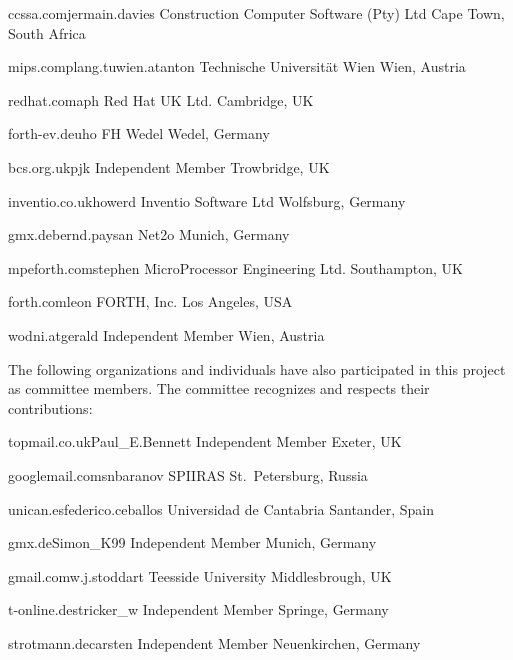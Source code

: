 	{ccssa.com}{jermain.davies}
	{Construction Computer Software (Pty) Ltd}
	{Cape Town, South Africa}

	{mips.complang.tuwien.at}{anton}
	{Technische Universit\"at Wien}
	{Wien, Austria}

	{redhat.com}{aph}
	{Red Hat UK Ltd.}
	{Cambridge, UK}

	{forth-ev.de}{uho}
	{FH Wedel}
	{Wedel, Germany}

	{bcs.org.uk}{pjk}
	{Independent Member}
	{Trowbridge, UK}

	{inventio.co.uk}{howerd}
	{Inventio Software Ltd}
	{Wolfsburg, Germany}

	{gmx.de}{bernd.paysan}
	{Net2o}
	{Munich, Germany}

	{mpeforth.com}{stephen}
	{MicroProcessor Engineering Ltd.}
	{Southampton, UK}

	{forth.com}{leon}
	{FORTH, Inc.}
	{Los Angeles, USA}

	{wodni.at}{gerald}
	{Independent Member}
	{Wien, Austria}

The following organizations and individuals have also participated in
this project as committee members. The committee recognizes and
respects their contributions:

	{topmail.co.uk}{Paul\_E.Bennett}
	{Independent Member}
	{Exeter, UK}

	{googlemail.com}{snbaranov}
	{SPIIRAS}
	{St.\ Petersburg, Russia}

	{unican.es}{federico.ceballos}
	{Universidad de Cantabria}
	{Santander, Spain}

	{gmx.de}{Simon\_K99}
	{Independent Member}
	{Munich, Germany}

	{gmail.com}{w.j.stoddart}
	{Teesside University}
	{Middlesbrough, UK}

	{t-online.de}{stricker\_w}
	{Independent Member}
	{Springe, Germany}

	{strotmann.de}{carsten}
	{Independent Member}
	{Neuenkirchen, Germany}


